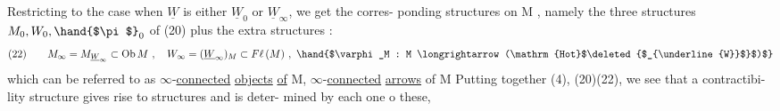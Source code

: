 Restricting to the case when $\underline{W}$ is either $\underline{W}_{0}$ or $\underline{W}_{\infty}$, we get the corres-%
ponding structures on M , namely the three structures $M_0, W_0, \hand{$\pi$}_0$ of (20)
plus the  extra structures :
\[
(22) \qquad M_\infty = M_{\underline{W}_\infty} \subset \mathrm{Ob}\,M \ , \quad W_\infty = (\underline{W}_\infty)_M \subset F\ell\,(M) \ , \ \hand{$\varphi_M : M \longrightarrow (\mathrm{Hot}$\deleted{$_{\underline{W}}$}$)$}
\]
which can be referred to as $\infty$-\uline{connected} \uline{objects} \uline{of} M,  $\infty$-\uline{connected}
\margin{$\times$} \uline{arrows} of M  Putting together (4), (20)\hand{,}(22), we see that a contractibi-%
lity structure  gives rise to   structures  and is deter-%
mined by each one o these, 


